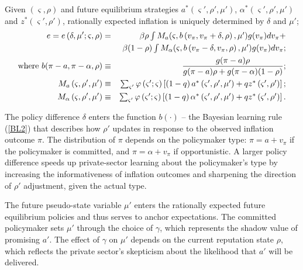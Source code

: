 \documentclass[12pt,letter,leqno]{article}
\theoremstyle{asn}
\theoremstyle{lem}
\theoremstyle{slem}
\theoremstyle{prop}
\theoremstyle{appprop}
\theoremstyle{rem}
\theoremstyle{defn}
\begin{document}
\begin{lem}\label{lem:eApp}%
Given $\left( \varsigma ,\rho \right) $ and future equilibrium strategies $a^{\ast }\left( \varsigma' ,\rho' ,\mu' \right) $, $%
\alpha ^{\ast }\left( \varsigma' ,\rho' ,\mu' \right) $ and $z^{\ast }\left(
\varsigma' ,\rho' \right) $, rationally expected inflation is uniquely
determined by $\delta$ and $\mu'$;%
\begin{eqnarray}
e =e\left( \delta ,\mu ^{\prime };\varsigma ,\rho \right) &=&\beta \rho \textstyle\int 
M_{a}(\varsigma ,b\left( v_\pi,v_\pi +\delta ,\rho \right) ,\mu ^{\prime })g(v_\pi)
dv_\pi+  \label{eq:RE} \\
&&\beta (1-\rho )\textstyle\int M_{\alpha}(\varsigma ,b\left(v_\pi -\delta ,v_\pi ,\rho \right) ,\mu ^{\prime })g(
v_\pi) dv_\pi; \notag\\
\text{where } b(\pi-a,\pi-\alpha,\rho) &\equiv&\frac{g(\pi-a)\rho}{g(\pi-a)\rho+g(\pi-\alpha)(1-\rho)}; \notag \\
M_{a}\left( \varsigma ,\rho ^{\prime },\mu ^{\prime }\right)
&\equiv&\textstyle\sum_{\varsigma ^{\prime }}\varphi \left( \varsigma ^{\prime };\varsigma
\right) \left[ \left( 1-q\right) a^{\ast }\left( \varsigma ^{\prime },\rho
^{\prime },\mu ^{\prime }\right) +qz^{\ast }\left( \varsigma ^{\prime },\rho
^{\prime }\right) \right] ;  \notag\\
M_{\alpha}\left( \varsigma ,\rho ^{\prime },\mu ^{\prime }\right)
&\equiv&\textstyle\sum_{\varsigma ^{\prime }}\varphi \left( \varsigma ^{\prime };\varsigma
\right) \left[ \left( 1-q\right) \alpha ^{\ast }\left( \varsigma ^{\prime
},\rho ^{\prime },\mu ^{\prime }\right) +qz^{\ast }\left( \varsigma ^{\prime
},\rho ^{\prime }\right) \right] .  \notag
\end{eqnarray}%
\end{lem}%
The policy difference $\delta$ enters the function $b(\cdot)$ -- the Bayesian learning rule (\ref{BL2}) that describes how $\rho'$ updates in response to the observed inflation outcome $\pi$. The distribution of $\pi$ depends on the policymaker type: $\pi = a + v_\pi$ if the policymaker is committed, and $\pi = \alpha + v_\pi$ if opportunistic. A larger policy difference speeds up private-sector learning about the policymaker’s type by increasing the informativeness of inflation outcomes and sharpening the direction of $\rho'$ adjustment, given the actual type.

The future pseudo-state variable $\mu'$ enters the rationally expected future equilibrium policies and thus serves to anchor expectations. The committed policymaker sets $\mu'$ through the choice of $\gamma$, which represents the shadow value of promising $a'$. The effect of $\gamma$ on $\mu'$ depends on the current reputation state $\rho$, which reflects the private sector’s skepticism about the likelihood that $a'$ will be delivered.
\end{document}
